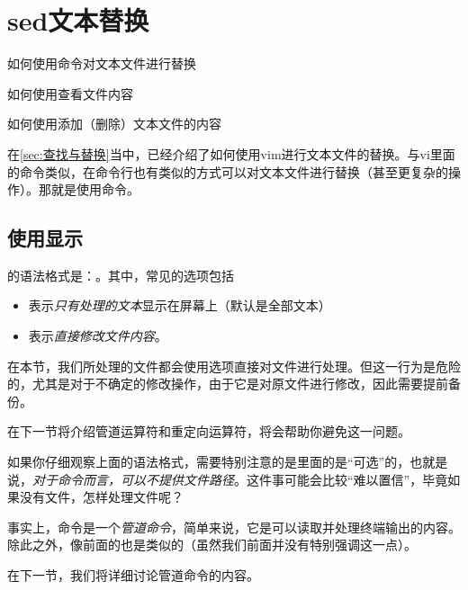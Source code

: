 \section{sed文本替换}\label{sec:sed文本替换}

\begin{Abstract}
    \item 如何使用命令对文本文件进行替换
    \item 如何使用查看文件内容
    \item 如何使用添加（删除）文本文件的内容
\end{Abstract}


在\ref{sec:查找与替换}当中，已经介绍了如何使用vim进行文本文件的替换。与vi里面的命令类似，在命令行也有类似的方式可以对文本文件进行替换（甚至更复杂的操作）。那就是使用命令。

\subsection{使用显示}\label{subsec:sed文本替换-使用sed显示}

的语法格式是：。其中，常见的选项包括

\begin{itemize}
    \item {} 表示\emph{只有处理的文本}显示在屏幕上（默认是全部文本）
    \item {} 表示\emph{直接修改文件内容}。
\end{itemize}

\begin{attention}
    在本节，我们所处理的文件都会使用选项直接对文件进行处理。但这一行为是危险的，尤其是对于不确定的修改操作，由于它是对原文件进行修改，因此需要提前备份。

    在下一节将介绍管道运算符和重定向运算符，将会帮助你避免这一问题。
\end{attention}

\begin{extend}
    如果你仔细观察上面的语法格式，需要特别注意的是里面的\code{[文件路径]}是“可选”的，也就是说，\emph{对于命令而言，可以不提供文件路径}。这件事可能会比较“难以置信”，毕竟如果没有文件，怎样处理文件呢？

    事实上，命令是一个\emph{管道命令}，简单来说，它是可以读取并处理终端输出的内容。除此之外，像前面的也是类似的（虽然我们前面并没有特别强调这一点）。

    在下一节，我们将详细讨论管道命令的内容。
\end{extend}

